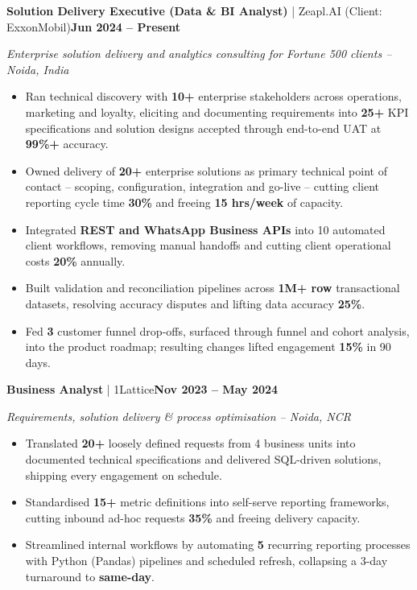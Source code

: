 \documentclass[a4paper,10pt]{article}
\newcommand{\headrow}[2]{%
  {\parfillskip=0pt\relax\rightskip=0pt\relax #1\hfill #2\par}%
}
\newcommand{\role}[4]{%
  \vspace{3pt}%
  \headrow{\textbf{#1} | #2}{\textbf{#4}}%
  \vspace{-1pt}%
  {\small\itshape\textcolor{black!62}{#3}\par}%
}
\begin{document}
\role{Solution Delivery Executive (Data \& BI Analyst)}{Zeapl.AI (Client: ExxonMobil)}{Enterprise solution delivery and analytics consulting for Fortune 500 clients -- Noida, India}{Jun 2024 -- Present}
\begin{itemize}
  \item Ran technical discovery with \textbf{10+} enterprise stakeholders across operations, marketing and loyalty, eliciting and documenting requirements into \textbf{25+} KPI specifications and solution designs accepted through end-to-end UAT at \textbf{99\%+} accuracy.
  \item Owned delivery of \textbf{20+} enterprise solutions as primary technical point of contact -- scoping, configuration, integration and go-live -- cutting client reporting cycle time \textbf{30\%} and freeing \textbf{15 hrs/week} of capacity.
  \item Integrated \textbf{REST and WhatsApp Business APIs} into 10 automated client workflows, removing manual handoffs and cutting client operational costs \textbf{20\%} annually.
  \item Built validation and reconciliation pipelines across \textbf{1M+ row} transactional datasets, resolving accuracy disputes and lifting data accuracy \textbf{25\%}.
  \item Fed \textbf{3} customer funnel drop-offs, surfaced through funnel and cohort analysis, into the product roadmap; resulting changes lifted engagement \textbf{15\%} in 90 days.
\end{itemize}

\role{Business Analyst}{1Lattice}{Requirements, solution delivery \& process optimisation -- Noida, NCR}{Nov 2023 -- May 2024}
\begin{itemize}
  \item Translated \textbf{20+} loosely defined requests from 4 business units into documented technical specifications and delivered SQL-driven solutions, shipping every engagement on schedule.
  \item Standardised \textbf{15+} metric definitions into self-serve reporting frameworks, cutting inbound ad-hoc requests \textbf{35\%} and freeing delivery capacity.
  \item Streamlined internal workflows by automating \textbf{5} recurring reporting processes with Python (Pandas) pipelines and scheduled refresh, collapsing a 3-day turnaround to \textbf{same-day}.
\end{itemize}

\end{document}
